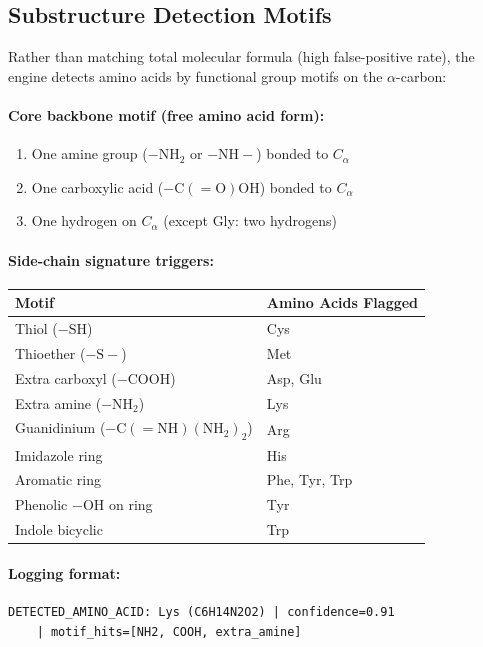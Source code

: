 \documentclass[11pt]{article}
\begin{document}
\subsection{Substructure Detection Motifs}

Rather than matching total molecular formula (high false-positive rate),
the engine detects amino acids by functional group motifs on the
$\alpha$-carbon:

\paragraph{Core backbone motif (free amino acid form):}
\begin{enumerate}
\item One amine group ($\mathrm{-NH_2}$ or $\mathrm{-NH-}$) bonded to $C_\alpha$
\item One carboxylic acid ($\mathrm{-C(=O)OH}$) bonded to $C_\alpha$
\item One hydrogen on $C_\alpha$ (except Gly: two hydrogens)
\end{enumerate}

\paragraph{Side-chain signature triggers:}
\begin{center}
\begin{tabular}{ll}
\toprule
Motif & Amino Acids Flagged \\
\midrule
Thiol ($\mathrm{-SH}$)                 & Cys \\
Thioether ($\mathrm{-S-}$)             & Met \\
Extra carboxyl ($\mathrm{-COOH}$)      & Asp, Glu \\
Extra amine ($\mathrm{-NH_2}$)         & Lys \\
Guanidinium ($\mathrm{-C(=NH)(NH_2)_2}$) & Arg \\
Imidazole ring                           & His \\
Aromatic ring                            & Phe, Tyr, Trp \\
Phenolic $\mathrm{-OH}$ on ring         & Tyr \\
Indole bicyclic                          & Trp \\
\end{tabular}
\end{center}

\paragraph{Logging format:}
\begin{lstlisting}[language={}]
DETECTED_AMINO_ACID: Lys (C6H14N2O2) | confidence=0.91
    | motif_hits=[NH2, COOH, extra_amine]
\end{lstlisting}
\end{document}
